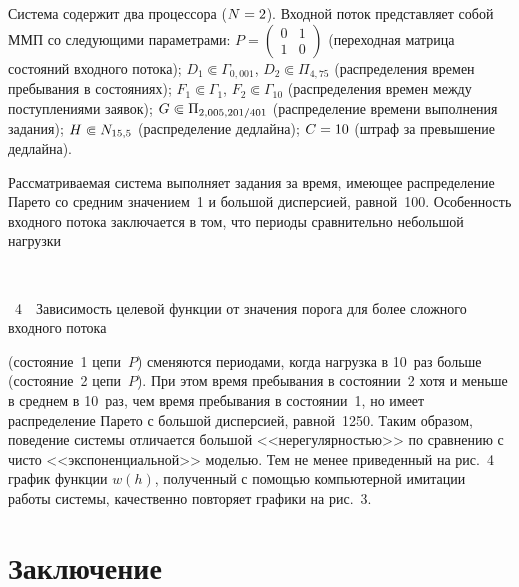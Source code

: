 \begin{multicols}{2}
  Система содержит два процессора ($N\hm=2$). Входной поток представляет собой 
ММП со следующими параметрами: $P=\begin{pmatrix} 0&1\\ 1&0\end{pmatrix}$ 
(переходная матрица состояний входного потока); $D_1\Subset \Gamma_{0{,}001}$, 
$D_2\Subset \Pi_{4{,}75}$ (распределения времен пребывания в состояниях); $F_1\Subset 
\Gamma_1$, $F_2\Subset \Gamma_{10}$ (распределения времен между поступлениями 
заявок); $G\hm\Subset \Pi_{2{,}005, {201}/{401}}$ (распределение времени выполнения 
задания); $H\hm\Subset N_{15,5}$ (распределение дедлайна); $C\hm=10$ (штраф за 
превышение дедлайна).



  Рассматриваемая система выполняет задания за время, имеющее распределение Парето 
со средним значением~1 и большой дисперсией, равной~100. Особенность входного 
потока заключается в том, что периоды сравнительно небольшой 
нагрузки\linebreak\vspace*{-12pt}
\begin{center}  %
\mbox{%
 \epsfxsize=72.598mm
 }
  \end{center}
  
  \vspace*{-4pt}
  
\noindent
{{\figurename~4}\ \ \small{Зависимость целевой функции от значения порога для более сложного входного потока}}

\vspace*{12pt}



\addtocounter{figure}{1}

\noindent
 (состояние~1 
цепи~$P$) сменяются периодами, когда нагрузка в 10~раз больше (состояние~2 цепи~$P$). 
При этом время пребывания в состоянии~2 хотя и меньше в среднем в 10~раз, чем время 
пребывания в состоянии~1, но имеет распределение Парето с большой дисперсией, 
равной~1250. Таким образом, поведение системы отличается большой 
<<нерегулярностью>> по сравнению с чисто <<экспоненциальной>> моделью. Тем не 
менее приведенный на рис.~4 график функции $w(h)$, полученный с помощью 
компьютерной имитации работы системы, качественно повторяет графики на рис.~3.

\section{Заключение}


\end{multicols}
